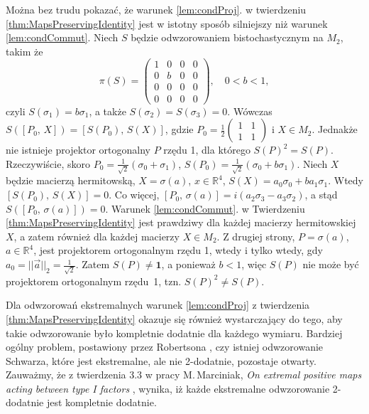 \begin{Example}
Można bez trudu pokazać, że warunek \ref{lem:condProj}. w
twierdzeniu \ref{thm:MapsPreservingIdentity} jest w istotny sposób silniejszy
niż warunek \ref{lem:condCommut}.
Niech $S$ będzie odwzorowaniem bistochastycznym na $M_{2}$, takim że
\begin{equation}
\label{RandomLabel:514431}
    \pi(S) = \begin{pmatrix}
    1 & 0 & 0 & 0 \\
    0 & b & 0 & 0 \\
    0 & 0 & 0 & 0 \\
    0 & 0 & 0 & 0
    \end{pmatrix},
    \quad 0 < b < 1,
\end{equation}
czyli $S(\sigma_{1}) = b \sigma_{1}$, a także
$S(\sigma_{2}) = S(\sigma_{3}) = 0$.
Wówczas $S\left( [P_{0}, \, X ] \right) = [ S(P_{0}), \, S(X) ]$,
gdzie
$P_{0}= \frac{1}{2} \left( \begin{smallmatrix}
 1 & 1 \\ 1 & 1
 \end{smallmatrix} \right)$ i $X \in M_{2}$.
Jednakże nie istnieje projektor ortogonalny $P$ rzędu 1,
dla którego $S(P)^{2} = S(P)$.
Rzeczywiście, skoro
$P_{0} = \frac{1}{\sqrt{2}}(\sigma_{0} + \sigma_{1})$,
$S(P_{0}) = \frac{1}{\sqrt{2}}(\sigma_{0} + b \sigma_{1})$.
Niech $X$ będzie macierzą hermitowską, $X = \sigma(a)$, $x \in \mathbb{R}^{4}$,
$S(X) = a_{0} \sigma_{0} + b a_{1} \sigma_{1}$.
Wtedy $[S(P_{0}), \, S(X) ] =0$.
Co więcej,
$[P_{0}, \, \sigma(a)] =
i(a_{2} \sigma_{3} - a_{3} \sigma_{2})$,
a stąd
$S([P_{0}, \, \sigma(a)]) = 0$.
Warunek \ref{lem:condCommut}. w Twierdzeniu \ref{thm:MapsPreservingIdentity}
jest prawdziwy dla każdej macierzy hermitowskiej $X$,
a zatem również dla każdej macierzy $X \in M_{2}$.
Z drugiej strony,
$P = \sigma(a)$, $a \in \mathbb{R}^{4}$, jest projektorem ortogonalnym
rzędu 1,
wtedy i tylko wtedy, gdy $a_{0} = ||\vec{a}||_{2} = \frac{1}{\sqrt{2}}$.
Zatem $S(P) \neq \mathbf{1}$, a ponieważ $b<1$,
więc $S(P)$ nie może być projektorem ortogonalnym \mbox{rzędu 1},
tzn. $S(P)^{2} \neq S(P)$.
\end{Example}

Dla odwzorowań ekstremalnych warunek \ref{lem:condProj} z
twierdzenia \ref{thm:MapsPreservingIdentity} okazuje się również wystarczający
do tego, aby takie odwzorowanie było kompletnie dodatnie dla każdego wymiaru.
Bardziej ogólny problem, postawiony przez Robertsona
\cite{robertson1983schwarz},
czy istniej odwzorowanie Schwarza, które jest ekstremalne, ale
nie 2-dodatnie, pozostaje otwarty.
Zauważmy, że z twierdzenia 3.3 w pracy
M.\,Marciniak, \emph{On extremal positive maps acting between type I factors}
\cite{marciniak2008extremal}, wynika, iż
każde ekstremalne odwzorowanie 2-dodatnie jest kompletnie dodatnie.

